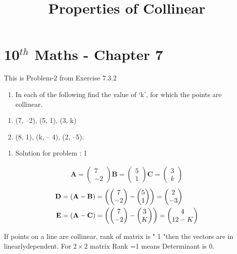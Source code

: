\documentclass[12pt]{article}
\newcommand{\myvec}[1]{\ensuremath{\begin{pmatrix}#1\end{pmatrix}}}
\let\vec\mathbf
\providecommand{\brak}[1]{\ensuremath{\left(#1\right)}}
\let\vec\mathbf
\begin{document}
\begin{center}
\title{\textbf{Properties of Collinear}}
\date{\vspace{-5ex}} %
\maketitle
\end{center}

\setcounter{page}{1}

\section{10$^{th}$ Maths - Chapter 7}

This is Problem-2 from Exercise 7.3.2

\begin{enumerate}
\item In each of the following find the value of ‘k’, for which the points are collinear.
\end{enumerate}
\begin{enumerate}
\item (7, –2), (5, 1), (3, k) \\
\item (8, 1), (k, – 4), (2, –5).\\
\end{enumerate}
\begin{enumerate} 
\item Solution for problem : 1
\end{enumerate}
\begin{align}  
\vec{A}=\myvec{7 \\-2}
\vec{B}=\myvec{5 \\ 1}
\vec{C}=\myvec{3 \\ k}
\end{align}
\begin{align}
\vec{D} &=\brak{\vec{A}-\vec{B}} = \brak{\myvec{7 \\-2 } - \myvec{5 \\1 } } = \myvec{2 \\ -3 }\\
\vec{E} &= \brak{\vec{A}-\vec{C}} = \brak{\myvec{7 \\ -2 } - \myvec{3 \\K } } = \myvec{4 \\1\-2-K}
\end{align}

 If points on a line  are  collinear, rank of matrix is " 1 "then the vectors are in linearlydependent.
For $2\times2$ matrix Rank =1 means Determinant is 0.
\end{document}
